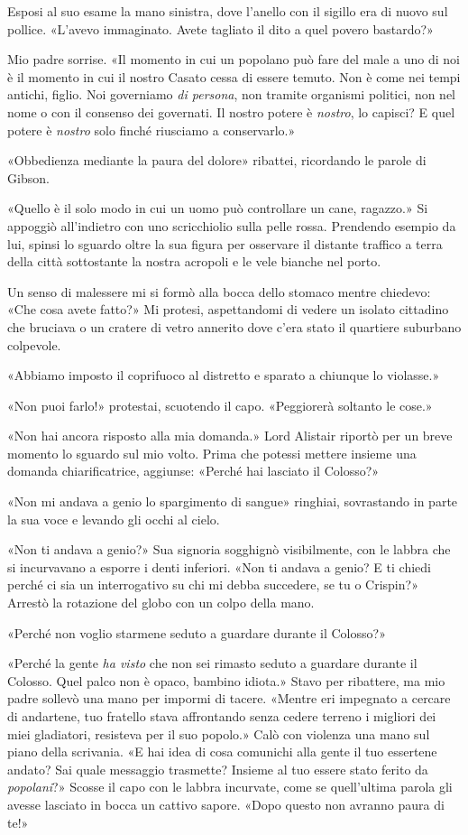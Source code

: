 Esposi al suo esame la mano sinistra, dove l'anello con il sigillo era
di nuovo sul pollice. «L'avevo immaginato. Avete tagliato il dito a quel
povero bastardo?»

Mio padre sorrise. «Il momento in cui un popolano può fare del male a
uno di noi è il momento in cui il nostro Casato cessa di essere temuto.
Non è come nei tempi antichi, figlio. Noi governiamo \emph{di persona},
non tramite organismi politici, non nel nome o con il consenso dei
governati. Il nostro potere è \emph{nostro}, lo capisci? E quel potere è
\emph{nostro} solo finché riusciamo a conservarlo.»

«Obbedienza mediante la paura del dolore» ribattei, ricordando le parole
di Gibson.

«Quello è il solo modo in cui un uomo può controllare un cane, ragazzo.»
Si appoggiò all'indietro con uno scricchiolio sulla pelle rossa.
Prendendo esempio da lui, spinsi lo sguardo oltre la sua figura per
osservare il distante traffico a terra della città sottostante la nostra
acropoli e le vele bianche nel porto.

Un senso di malessere mi si formò alla bocca dello stomaco mentre
chiedevo: «Che cosa avete fatto?» Mi protesi, aspettandomi di vedere un
isolato cittadino che bruciava o un cratere di vetro annerito dove c'era
stato il quartiere suburbano colpevole.

«Abbiamo imposto il coprifuoco al distretto e sparato a chiunque lo
violasse.»

«Non puoi farlo!» protestai, scuotendo il capo. «Peggiorerà soltanto le
cose.»

«Non hai ancora risposto alla mia domanda.» Lord Alistair riportò per un
breve momento lo sguardo sul mio volto. Prima che potessi mettere
insieme una domanda chiarificatrice, aggiunse: «Perché hai lasciato il
Colosso?»

«Non mi andava a genio lo spargimento di sangue» ringhiai, sovrastando
in parte la sua voce e levando gli occhi al cielo.

«Non ti andava a genio?» Sua signoria sogghignò visibilmente, con le
labbra che si incurvavano a esporre i denti inferiori. «Non ti andava a
genio? E ti chiedi perché ci sia un interrogativo su chi mi debba
succedere, se tu o Crispin?» Arrestò la rotazione del globo con un colpo
della mano.

«Perché non voglio starmene seduto a guardare durante il Colosso?»

«Perché la gente \emph{ha visto} che non sei rimasto seduto a guardare
durante il Colosso. Quel palco non è opaco, bambino idiota.» Stavo per
ribattere, ma mio padre sollevò una mano per impormi di tacere. «Mentre
eri impegnato a cercare di andartene, tuo fratello stava affrontando
senza cedere terreno i migliori dei miei gladiatori, resisteva per il
suo popolo.» Calò con violenza una mano sul piano della scrivania. «E
hai idea di cosa comunichi alla gente il tuo essertene andato? Sai quale
messaggio trasmette? Insieme al tuo essere stato ferito da
\emph{popolani}?» Scosse il capo con le labbra incurvate, come se
quell'ultima parola gli avesse lasciato in bocca un cattivo sapore.
«Dopo questo non avranno paura di te!»

